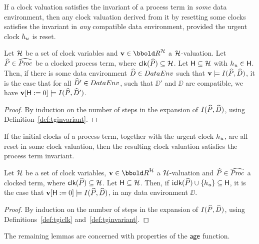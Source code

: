 If a clock valuation satisfies the invariant of a process term in
\emph{some} data environment, then any clock valuation derived from it
by resetting some clocks satisfies the invariant in \emph{any} compatible data
environment, provided the urgent clock $h_{u}$ is reset.
\begin{lemma}\label{lem:pfinvpreservedinnewenv}
Let $\clocks$ be a set of clock variables and $\clkvl \in \clkvls$ a
$\clocks$-valuation. Let ${\widehat{P}} \in \widehat{\text{\it Proc\/}_{}}$ be a clocked process term,
where $\clk(\PP) \subseteq \clocks$. Let $\someclks \subseteq \clocks$
with $h_{u} \in {\sf H}$. Then, if there is some data environment
$\widehat{D} \in {DataEnv_{}}$ such that $\mathbf{v} \models
I({\widehat{P}},\widehat{D})$, it is the case that for all $\widehat{D}' \in {DataEnv_{}}$, such
that $\DD'$ and $\DD$ are compatible, we have $\mathbf{v}[{\sf H}:=0]
\models I({\widehat{P}},\widehat{D}')$.
\end{lemma}
\begin{proof}
By induction on the number of steps in the expansion of $I({\widehat{P}},\widehat{D})$, 
using Definition~\ref{def:tginvariant}.
\end{proof}

If the initial clocks of a process term, together with the urgent
clock $h_{u}$, are all reset in some clock valuation, then the
resulting clock valuation satisfies the process term invariant.
\begin{lemma}\label{lem:pfprocinv}
Let $\clocks$ be a set of clock variables,
$\clkvl \in \clkvls$ a $\clocks$-valuation and ${\widehat{P}} \in
\widehat{\text{\it Proc\/}_{}}$ a clocked term, where $\clk(\PP) \subseteq \clocks$. 
Let $\someclks \subseteq \clocks$. Then, if ${\mathop{\mathrm{i}{\sf clk}}}({\widehat{P}}) \cup \{h_{u}\} 
\subseteq {\sf H}$, it is the case that 
$\mathbf{v}[{\sf H}:=0] \models I({\widehat{P}},\widehat{D})$, in any data environment $\DD$.
\end{lemma}
\begin{proof}
By induction on the number of steps in the expansion of $I({\widehat{P}},\widehat{D})$, 
using Definitions~\ref{def:tgiclk} and~\ref{def:tginvariant}.
\end{proof}

The remaining lemmas are concerned with properties of the $\mathop{\sf age}$
function.

